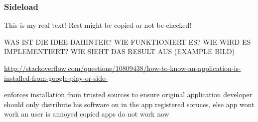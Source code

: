 \subsubsection{Sideload} \label{subsubsection:counter-improve-tampering-sideload}
This is my real text! Rest might be copied or not be checked!

WAS IST DIE IDEE DAHINTER? WIE FUNKTIONIERT ES? WIE WIRD ES IMPLEMENTIERT? WIE SIEHT DAS RESULT AUS (EXAMPLE BILD)\newline

\url{http://stackoverflow.com/questions/10809438/how-to-know-an-application-is-installed-from-google-play-or-side-}

enforces installation from trusted sources to ensure original application
developer should only distribute his software on in the app registered soruces, else app wont work an user is annoyed
copied apps do not work now


